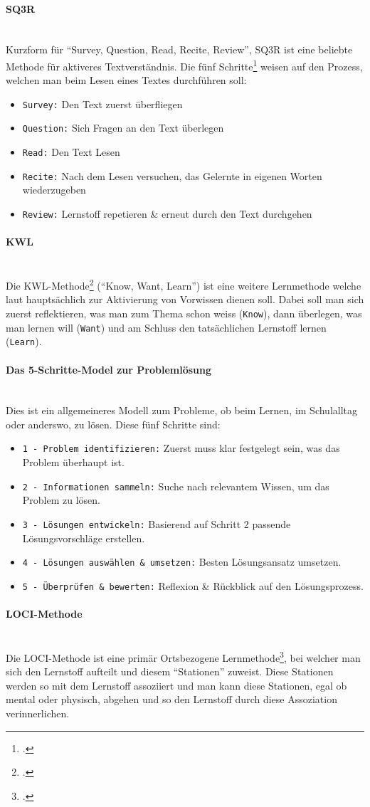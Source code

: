 \documentclass[12pt,a4paper]{report}
\newcommand{\myparagraph}[1]{\paragraph{#1}\mbox{}\\}
\begin{document}
\myparagraph{SQ3R}
Kurzform für \enquote{Survey, Question, Read, Recite, Review}, SQ3R ist eine beliebte Methode für aktiveres Textverständnis. Die fünf Schritte\footcite{SQ3R} weisen auf den Prozess, welchen man beim Lesen eines Textes durchführen soll:
\begin{itemize}
    \item \texttt{Survey:} Den Text zuerst überfliegen
    \item \texttt{Question:} Sich Fragen an den Text überlegen
    \item \texttt{Read:} Den Text Lesen
    \item \texttt{Recite:} Nach dem Lesen versuchen, das Gelernte in eigenen Worten wiederzugeben
    \item \texttt{Review:} Lernstoff repetieren \& erneut durch den Text durchgehen
\end{itemize}

\myparagraph{KWL}
Die KWL-Methode\footcite{SQ3R} (\enquote{Know, Want, Learn}) ist eine weitere Lernmethode welche laut \textcite{SQ3R} hauptsächlich zur Aktivierung von Vorwissen dienen soll. 
Dabei soll man sich zuerst reflektieren, was man zum Thema schon weiss (\texttt{Know}), dann überlegen, was man lernen will (\texttt{Want}) und am Schluss den tatsächlichen Lernstoff lernen (\texttt{Learn}).

\myparagraph{Das 5-Schritte-Model zur Problemlösung}
Dies ist ein allgemeineres Modell zum Probleme, ob beim Lernen, im Schulalltag oder anderswo, zu lösen. Diese fünf Schritte sind:
\begin{itemize}
    \item \texttt{1 - Problem identifizieren:} Zuerst muss klar festgelegt sein, was das Problem überhaupt ist.
    \item \texttt{2 - Informationen sammeln:} Suche nach relevantem Wissen, um das Problem zu lösen.
    \item \texttt{3 - Lösungen entwickeln:} Basierend auf Schritt 2 passende Lösungsvorschläge erstellen.
    \item \texttt{4 - Lösungen auswählen \& umsetzen:} Besten Lösungsansatz umsetzen.
    \item \texttt{5 - Überprüfen \& bewerten:} Reflexion \& Rückblick auf den Lösungsprozess.
\end{itemize}

\myparagraph{LOCI-Methode}
Die LOCI-Methode ist eine primär Ortsbezogene Lernmethode\footcite{SQ3R}, bei welcher man sich den Lernstoff aufteilt und diesem \enquote{Stationen} zuweist.
Diese Stationen werden so mit dem Lernstoff assoziiert und man kann diese Stationen, egal ob mental oder physisch, abgehen und so den Lernstoff durch diese Assoziation verinnerlichen.
\end{document}
